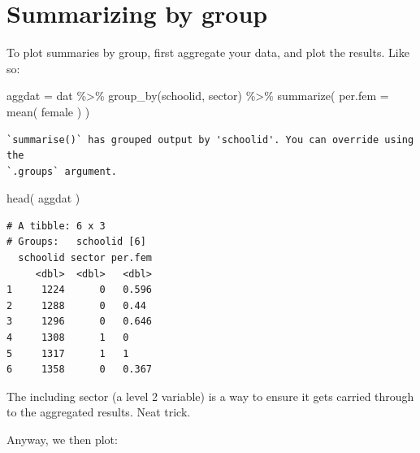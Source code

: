 \documentclass[
  letterpaper,
  DIV=11,
  numbers=noendperiod]{scrreprt}
\newenvironment{Shaded}{\begin{snugshade}}{\end{snugshade}}
\newcommand{\AttributeTok}[1]{\textcolor[rgb]{0.49,0.56,0.16}{#1}}
\newcommand{\FunctionTok}[1]{\textcolor[rgb]{0.02,0.16,0.49}{#1}}
\newcommand{\NormalTok}[1]{\textcolor[rgb]{0.00,0.44,0.13}{#1}}
\newcommand{\OtherTok}[1]{\textcolor[rgb]{0.00,0.44,0.13}{#1}}
\newcommand{\SpecialCharTok}[1]{\textcolor[rgb]{0.25,0.44,0.63}{#1}}
\newcommand{\StringTok}[1]{\textcolor[rgb]{0.25,0.44,0.63}{#1}}
\begin{document}
\hypertarget{summarizing-by-group}{%
\section{Summarizing by group}\label{summarizing-by-group}}

To plot summaries by group, first aggregate your data, and plot the
results. Like so:

\begin{Shaded}
\begin{Highlighting}[]
\NormalTok{aggdat }\OtherTok{=}\NormalTok{ dat }\SpecialCharTok{\%\textgreater{}\%} 
  \FunctionTok{group\_by}\NormalTok{(schoolid, sector) }\SpecialCharTok{\%\textgreater{}\%}
  \FunctionTok{summarize}\NormalTok{( }\AttributeTok{per.fem =} \FunctionTok{mean}\NormalTok{( female ) )}
\end{Highlighting}
\end{Shaded}

\begin{verbatim}
`summarise()` has grouped output by 'schoolid'. You can override using the
`.groups` argument.
\end{verbatim}

\begin{Shaded}
\begin{Highlighting}[]
\FunctionTok{head}\NormalTok{( aggdat )}
\end{Highlighting}
\end{Shaded}

\begin{verbatim}
# A tibble: 6 x 3
# Groups:   schoolid [6]
  schoolid sector per.fem
     <dbl>  <dbl>   <dbl>
1     1224      0   0.596
2     1288      0   0.44 
3     1296      0   0.646
4     1308      1   0    
5     1317      1   1    
6     1358      0   0.367
\end{verbatim}

The including sector (a level 2 variable) is a way to ensure it gets
carried through to the aggregated results. Neat trick.

Anyway, we then plot:

\begin{Shaded}
\end{Shaded}
\end{document}
